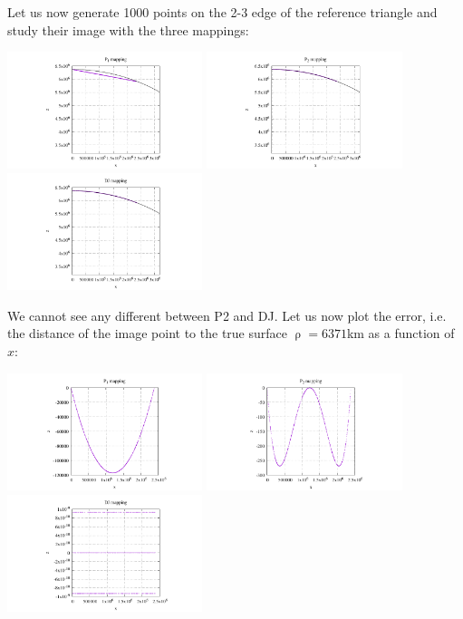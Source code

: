 Let us now generate 1000 points on the 2-3 edge of the reference triangle and study their image 
with the three mappings:
\begin{center}
\includegraphics[width=5.7cm]{images/mappings/DJ/triangles/xz_P1_boundary.pdf}
\includegraphics[width=5.7cm]{images/mappings/DJ/triangles/xz_P2_boundary.pdf}
\includegraphics[width=5.7cm]{images/mappings/DJ/triangles/xz_DJ_boundary.pdf}
\end{center}
We cannot see any different between P2 and DJ. 
Let us now plot the error, i.e. the distance of the image point to the true surface $\uprho=6371$km
as a function of $x$:
\begin{center}
\includegraphics[width=5.7cm]{images/mappings/DJ/triangles/xz_P1_boundary_error.pdf}
\includegraphics[width=5.7cm]{images/mappings/DJ/triangles/xz_P2_boundary_error.pdf}
\includegraphics[width=5.7cm]{images/mappings/DJ/triangles/xz_DJ_boundary_error.pdf}
\end{center}
